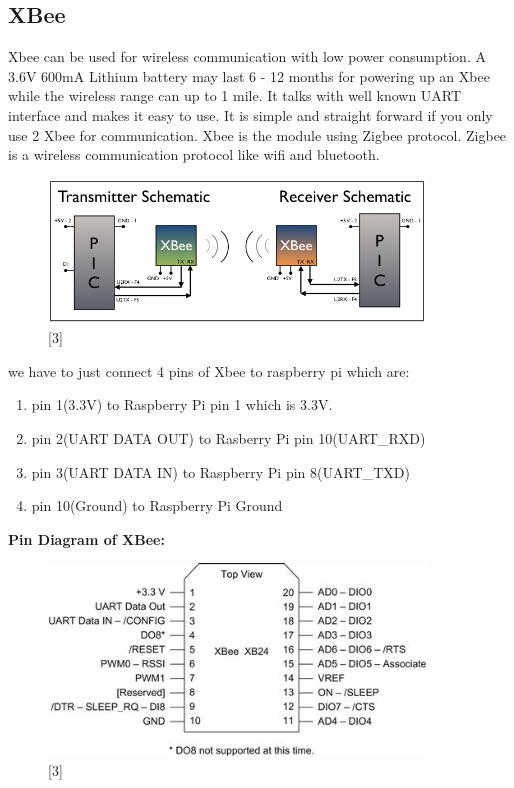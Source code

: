 \documentclass[11pt,a4paper]{article}
\begin{document}
	\subsection{XBee }
	Xbee can be used for wireless communication with low power consumption. A 3.6V 600mA Lithium battery may last 6 - 12 months for powering up an Xbee while the wireless range can up to 1 mile. It talks with well known UART interface and makes it easy to use. It is simple and straight forward if you only use 2 Xbee for communication. Xbee is the module using Zigbee protocol. Zigbee is a wireless communication protocol like wifi and bluetooth.  
		\begin{figure}[h!]
			\includegraphics[width=10cm]{XBee.jpg}
			\centering
			\caption{[3]}
		\end{figure} 
	we have to just connect 4 pins of Xbee to raspberry pi which are:
	\begin{enumerate}
		\item pin 1(3.3V) to Raspberry Pi pin 1 which is 3.3V.
		\item pin 2(UART DATA OUT) to Rasberry Pi pin 10(UART\_RXD)
		\item pin 3(UART DATA IN) to Raspberry Pi pin 8(UART\_TXD)
		\item pin 10(Ground) to Raspberry Pi Ground
	\end{enumerate}
	\textbf{Pin Diagram of XBee:}
			\begin{figure}[h!]
				\includegraphics[width=10cm]{Xbee_pin_diag.jpg}
				\centering
				\caption{[3]}
			\end{figure} 
		\newpage
		
\end{document}
